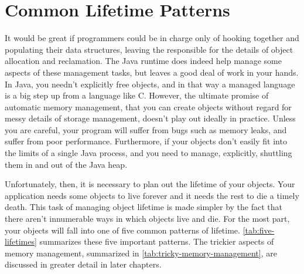\chapter{Common Lifetime Patterns}
It would be great if programmers could be in charge only of hooking together and
populating their data structures, leaving the \jre responsible for the details of
object allocation and reclamation. The Java runtime does indeed help manage some
aspects of these management tasks, but leaves a good deal of work in your hands.
In Java, you needn't explicitly free objects, and in that way a managed language
is a big step up from a language like C. However, the ultimate promise of
automatic memory management, that you can create objects without regard for messy
details of storage management, doesn't play out ideally in practice. Unless you
are careful, your program will suffer from bugs such as memory leaks, and suffer
from poor performance. Furthermore, if your objects don't easily fit into the
limits of a single Java process, and you need to manage, explicitly, shuttling
them in and out of the Java heap.

Unfortunately, then, it is necessary to plan out the lifetime of your objects.
Your application needs some objects to live forever and it needs the rest to die
a timely death. This task of managing object lifetime is made simpler by the
fact that there aren't innumerable ways in which objects live and die. For the most part, your objects
will fall into one of five common patterns of lifetime.
\autoref{tab:five-lifetimes} summarizes these five important patterns.
The trickier aspects of memory management, summarized in
\autoref{tab:tricky-memory-management}, are discussed in greater detail in later
chapters.

